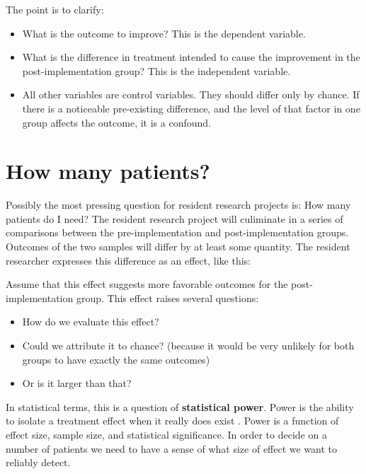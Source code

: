 \documentclass[
]{report}
\providecommand{\tightlist}{%
  \setlength{\itemsep}{0pt}\setlength{\parskip}{0pt}}
\begin{document}
The point is to clarify:

\begin{itemize}
\tightlist
\item
  What is the outcome to improve? This is the dependent variable.
\item
  What is the difference in treatment intended to cause the improvement
  in the post-implementation group? This is the independent variable.
\item
  All other variables are control variables. They should differ only by
  chance. If there is a noticeable pre-existing difference, and the
  level of that factor in one group affects the outcome, it is a
  confound.
\end{itemize}

\hypertarget{how-many-patients}{%
\section{How many patients?}\label{how-many-patients}}

Possibly the most pressing question for resident research projects is:
How many patients do I need? The resident research project will
culiminate in a series of comparisons between the pre-implementation and
post-implementation groups. Outcomes of the two samples will differ by
at least some quantity. The resident researcher expresses this
difference as an effect, like this:

Assume that this effect suggests more favorable outcomes for the
post-implementation group. This effect raises several questions:

\begin{itemize}
\tightlist
\item
  How do we evaluate this effect?
\item
  Could we attribute it to chance? (because it would be very unlikely
  for both groups to have exactly the same outcomes)
\item
  Or is it larger than that?
\end{itemize}

In statistical terms, this is a question of \textbf{statistical power}.
Power is the ability to isolate a treatment effect when it really does
exist \citep{Cohen1988}. Power is a function of effect size, sample
size, and statistical significance. In order to decide on a number of
patients we need to have a sense of what size of effect we want to
reliably detect.
\end{document}
